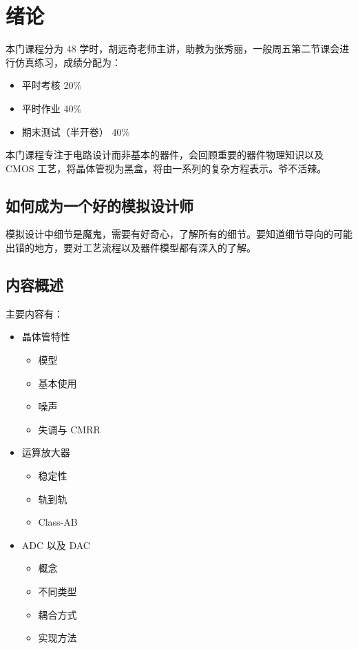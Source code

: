 \documentclass[cn,11pt,chinese,black,simple]{../elegantbook}
\begin{document}
\fi 
\def\chapname{00intro}

\chapter{绪论}

本门课程分为 48 学时，胡远奇老师主讲，助教为张秀丽，一般周五第二节课会进行仿真练习，成绩分配为：

\begin{itemize}
    \item 平时考核 20\%
    \item 平时作业 40\%
    \item 期末测试（半开卷） 40\% 
\end{itemize}

本门课程专注于电路设计而非基本的器件，会回顾重要的器件物理知识以及 CMOS 工艺，将晶体管视为黑盒，将由一系列的复杂方程表示。爷不活辣。

\section{如何成为一个好的模拟设计师}

模拟设计中细节是魔鬼，需要有好奇心，了解所有的细节。要知道细节导向的可能出错的地方，要对工艺流程以及器件模型都有深入的了解。

\section{内容概述}

主要内容有：

\begin{itemize}
    \item 晶体管特性
    \begin{itemize}
        \item 模型
        \item 基本使用
        \item 噪声
        \item 失调与 CMRR
    \end{itemize}
    \item 运算放大器
    \begin{itemize}
        \item 稳定性
        \item 轨到轨
        \item Class-AB
    \end{itemize}
    \item ADC 以及 DAC
    \begin{itemize}
        \item 概念
        \item 不同类型
        \item 耦合方式
        \item 实现方法
    \end{itemize}
\end{itemize}


\let\chapname\undefined
\ifx\mainclass\undefined
\end{document}
